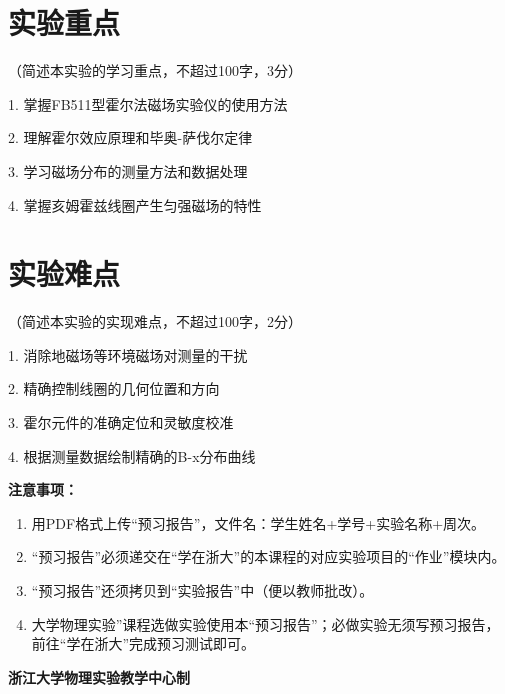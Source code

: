 \documentclass[10pt,a4paper]{ctexart}
\newcommand{\myspace}[1]{\par\vspace{#1\baselineskip}} %
\newcommand{\sihao}{\fontsize{14pt}{18pt}\selectfont}
\newcommand{\xiaosi}{\fontsize{12pt}{16pt}\selectfont}
\begin{document}
\myspace{2}
    
    \section{实验重点}
    
    \xiaosi（简述本实验的学习重点，不超过100字，3分）

    
    1. 掌握FB511型霍尔法磁场实验仪的使用方法

    2. 理解霍尔效应原理和毕奥-萨伐尔定律

    3. 学习磁场分布的测量方法和数据处理

    4. 掌握亥姆霍兹线圈产生匀强磁场的特性

    \myspace{2}
    
    \section{实验难点}

    \xiaosi（简述本实验的实现难点，不超过100字，2分）

    1. 消除地磁场等环境磁场对测量的干扰

    2. 精确控制线圈的几何位置和方向

    3. 霍尔元件的准确定位和灵敏度校准

    4. 根据测量数据绘制精确的B-x分布曲线
\myspace{2}


\newpage

\sihao\textbf{注意事项：}
\xiaosi
\begin{enumerate}
    \item 用PDF格式上传“预习报告”，文件名：学生姓名+学号+实验名称+周次。
    \item “预习报告”必须递交在“学在浙大”的本课程的对应实验项目的“作业”模块内。
    \item “预习报告”还须拷贝到“实验报告”中（便以教师批改）。
    \item 大学物理实验”课程选做实验使用本“预习报告”；必做实验无须写预习报告，前往“学在浙大”完成预习测试即可。
\end{enumerate}

\vspace{1cm}
\xiaosi\centering \textbf{浙江大学物理实验教学中心制}
\end{document}
